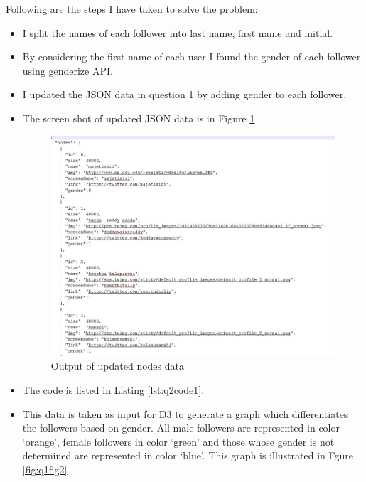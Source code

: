 Following are the steps I have taken to solve the problem:
\begin{itemize}
\item I split the names of each follower into last name, first name and initial. 
\item By considering the first name of each user I found the gender of each follower using genderize API.
\item I updated the JSON data in question 1 by adding gender to each follower.
\newpage
\item The screen shot of updated JSON data is in Figure \ref{fig:q1fig1}
\begin{figure}[h!]
\begin{center}
\includegraphics[scale=0.55, keepaspectratio=true]{figures/6.JPG}
\caption{Output of updated nodes data}
\label{fig:q1fig1}
\end{center}
\end{figure}
\item The code is listed in Listing \ref{lst:q2code1}.
\newpage
\item This data is taken as input for D3 to generate a graph which differentiates the followers based on gender. All male followers are represented in color `orange', female followers in color `green' and those whose gender is not determined are represented in color `blue'. This graph is illustrated in Fgure \ref{fig:q1fig2}
\begin{figure}[h!]
\begin{center}

\end{center}
\end{figure}
\end{itemize}
